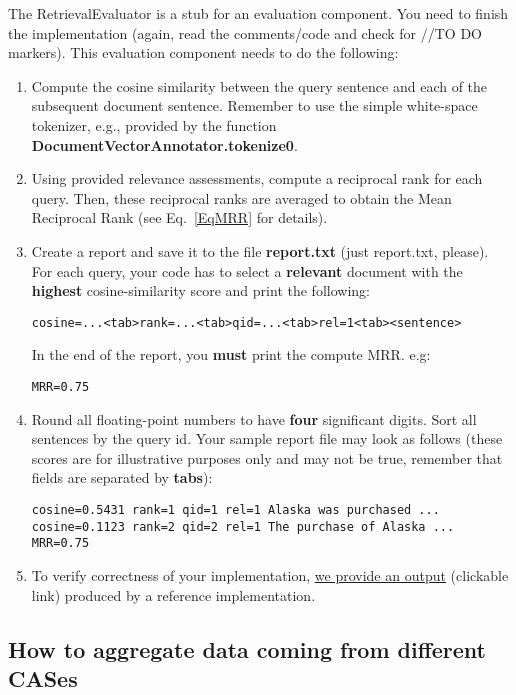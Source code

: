\documentclass[oneside,11pt]{memoir}
\begin{document}
The RetrievalEvaluator is a stub for an evaluation component. 
You need to finish the implementation
(again, read the comments/code and check for //TO DO markers).
This evaluation component needs to do the following:
\begin{enumerate}
\item Compute the cosine similarity between the query sentence and each of the subsequent
document sentence. Remember to use the
simple white-space tokenizer, e.g.,
provided by the function \textbf{DocumentVectorAnnotator.tokenize0}.
\item Using provided relevance assessments, compute a reciprocal rank for each query.
Then, these reciprocal ranks are averaged to obtain the Mean Reciprocal Rank (see Eq.~\ref{EqMRR} for details).
\item Create a report and save it to the file \textbf{report.txt} (just report.txt, please). 
For each query, your code has to select a \textbf{relevant} document with the
\textbf{highest} cosine-similarity score and print the following:
\begin{verbatim}
cosine=...<tab>rank=...<tab>qid=...<tab>rel=1<tab><sentence>
\end{verbatim}
In the end of the report, you \textbf{must} print the compute MRR. e.g:
\begin{verbatim}
MRR=0.75
\end{verbatim}
\item Round all floating-point numbers to have \textbf{four} significant digits.
Sort all sentences by the query id.
Your sample report file may look as follows (these scores are for illustrative purposes only 
and may not be true, remember that fields are separated by \textbf{tabs}):
\begin{verbatim}
cosine=0.5431 rank=1 qid=1 rel=1 Alaska was purchased ...
cosine=0.1123 rank=2 qid=2 rel=1 The purchase of Alaska ...
MRR=0.75
\end{verbatim}
\item To verify correctness of your implementation,
\href{https://raw.githubusercontent.com/amaiberg/software-engineering-preliminary/master/src/retrieval-error-analysis/sample_report1_5.txt}{we provide an output} (clickable link) produced
by a reference implementation.
\end{enumerate}

\begingroup
\renewcommand{\cleardoublepage}{}
\renewcommand{\clearpage}{}
\subsection{How to aggregate data coming from different CASes} 
\endgroup
\end{document}
